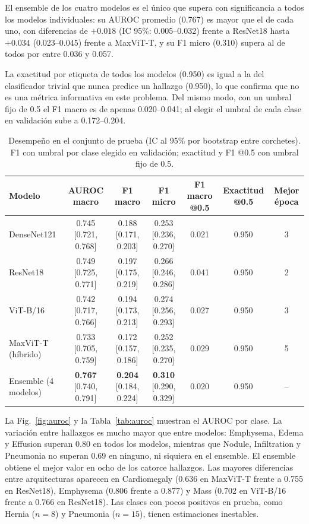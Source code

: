 \documentclass[conference]{IEEEtran}
\begin{document}
El ensemble de los cuatro modelos es el único que supera con significancia a todos los modelos individuales: su AUROC promedio (0.767) es mayor que el de cada uno, con diferencias de $+0.018$ (IC 95\%: 0.005--0.032) frente a ResNet18 hasta $+0.034$ (0.023--0.045) frente a MaxViT-T, y su F1 micro (0.310) supera al de todos por entre 0.036 y 0.057.

La exactitud por etiqueta de todos los modelos (0.950) es igual a la del clasificador trivial que nunca predice un hallazgo (0.950), lo que confirma que no es una métrica informativa en este problema. Del mismo modo, con un umbral fijo de 0.5 el F1 macro es de apenas 0.020--0.041; al elegir el umbral de cada clase en validación sube a 0.172--0.204.

\begin{table}[t]
\centering
\caption{Desempeño en el conjunto de prueba (IC al 95\% por bootstrap entre corchetes). F1 con umbral por clase elegido en validación; exactitud y F1 @0.5 con umbral fijo de 0.5.}
\label{tab:resultados}
\begin{tabular}{lcccccc}
\toprule
Modelo & AUROC macro & F1 macro & F1 micro & F1 macro @0.5 & Exactitud @0.5 & Mejor época \\
\midrule
DenseNet121 & 0.745 [0.721, 0.768] & 0.188 [0.171, 0.203] & 0.253 [0.236, 0.270] & 0.021 & 0.950 & 3 \\
ResNet18 & 0.749 [0.725, 0.771] & 0.197 [0.175, 0.219] & 0.266 [0.246, 0.286] & 0.041 & 0.950 & 2 \\
ViT-B/16 & 0.742 [0.717, 0.766] & 0.194 [0.173, 0.213] & 0.274 [0.256, 0.293] & 0.027 & 0.950 & 3 \\
MaxViT-T (híbrido) & 0.733 [0.705, 0.759] & 0.172 [0.157, 0.186] & 0.252 [0.235, 0.270] & 0.029 & 0.950 & 5 \\
\midrule
Ensemble (4 modelos) & \textbf{0.767} [0.740, 0.791] & \textbf{0.204} [0.184, 0.224] & \textbf{0.310} [0.290, 0.329] & 0.020 & 0.950 & -- \\
\bottomrule
\end{tabular}
\end{table}

La Fig.~\ref{fig:auroc} y la Tabla~\ref{tab:auroc} muestran el AUROC por clase. La variación entre hallazgos es mucho mayor que entre modelos: Emphysema, Edema y Effusion superan 0.80 en todos los modelos, mientras que Nodule, Infiltration y Pneumonia no superan 0.69 en ninguno, ni siquiera en el ensemble. El ensemble obtiene el mejor valor en ocho de los catorce hallazgos. Las mayores diferencias entre arquitecturas aparecen en Cardiomegaly (0.636 en MaxViT-T frente a 0.755 en ResNet18), Emphysema (0.806 frente a 0.877) y Mass (0.702 en ViT-B/16 frente a 0.766 en ResNet18). Las clases con pocos positivos en prueba, como Hernia ($n=8$) y Pneumonia ($n=15$), tienen estimaciones inestables.
\end{document}
